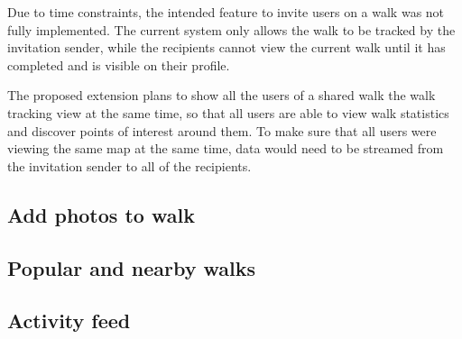 Due to time constraints, the intended feature to invite users on a walk was not fully implemented. The current system only allows the walk to be tracked by the invitation sender, while the recipients cannot view the current walk until it has completed and is visible on their profile.

The proposed extension plans to show all the users of a shared walk the walk tracking view at the same time, so that all users are able to view walk statistics and discover points of interest around them. To make sure that all users were viewing the same map at the same time, data would need to be streamed from the invitation sender to all of the recipients.

\subsection{Add photos to walk}

\subsection{Popular and nearby walks}

\subsection{Activity feed}